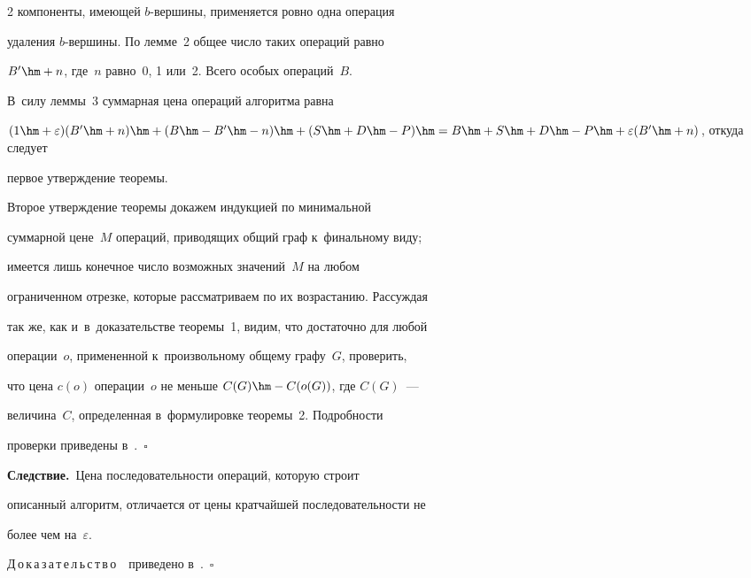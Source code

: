 \begin{multicols}{2}
компоненты, имеющей $b$-вер\-ши\-ны, применяется ровно одна операция 


удаления $b$-вер\-ши\-ны. По лемме~2 общее число таких операций равно 


$B^\prime\hm+n$, где~$n$ равно~0, 1 или~2. Всего особых операций~$B$. 


В~силу леммы~3 суммарная цена операций алгоритма равна 


$(1\hm+\varepsilon)(B^\prime\hm+n)\hm+(B\hm- B^\prime\hm- n)\hm+(S\hm+D\hm- 


P)\hm=B\hm+S\hm+ D\hm- P\hm+\varepsilon(B^\prime \hm+n)$, откуда следует 


первое утверждение теоремы. 


  


  Второе утверждение теоремы докажем индукцией по минимальной 


суммарной цене~$M$ операций, приводящих общий граф к~финальному виду; 


имеется лишь конечное число возможных значений~$M$ на любом 


ограниченном отрезке, которые рассматриваем по их возрастанию. Рассуждая 


так же, как и~в~доказательстве теоремы~1, видим, что достаточно для любой 


операции~$o$, примененной к~произвольному общему графу~$G$, проверить, 


что цена $c(o)$ операции~$o$ не меньше $C(G)\hm- C(o(G))$, где $C(G)$~--- 


величина~$C$, определенная в~формулировке теоремы~2. Подробности 


проверки приведены в~\cite[п.~4]{1-gor}.~$\square$


  


  \smallskip


  


  \noindent


  \textbf{Следствие.}\ Цена последовательности операций, которую строит 


описанный алгоритм, отличается от цены кратчайшей последовательности не 


более чем на~$\varepsilon$.


  


  \smallskip


  \noindent


  Д\,о\,к\,а\,з\,а\,т\,е\,л\,ь\,с\,т\,в\,о\ \ приведено в~\cite{7-gor}.~$\square$



\end{multicols}
